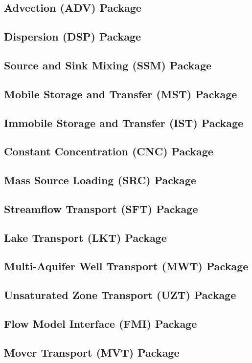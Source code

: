 \newpage
\subsection{Advection (ADV) Package}


\newpage
\subsection{Dispersion (DSP) Package}


\newpage
\subsection{Source and Sink Mixing (SSM) Package}


\newpage
\subsection{Mobile Storage and Transfer (MST) Package}


\newpage
\subsection{Immobile Storage and Transfer (IST) Package}


\newpage
\subsection{Constant Concentration (CNC) Package}


\newpage
\subsection{Mass Source Loading (SRC) Package}


\newpage
\subsection{Streamflow Transport (SFT) Package}


\newpage
\subsection{Lake Transport (LKT) Package}


\newpage
\subsection{Multi-Aquifer Well Transport (MWT) Package}


\newpage
\subsection{Unsaturated Zone Transport (UZT) Package}


\newpage
\subsection{Flow Model Interface (FMI) Package}


\newpage
\subsection{Mover Transport (MVT) Package}


